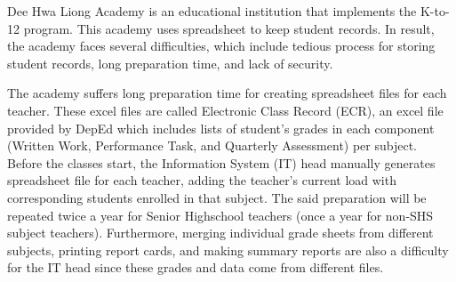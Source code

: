 \documentclass[11pt,a4paper,titlepage]{article}
\begin{document}




Dee Hwa Liong Academy is an educational institution that implements the K-to-12 program. This academy uses spreadsheet to keep student records. In result, the academy faces several difficulties, which include tedious process for storing student records, long preparation time, and lack of security.

The academy suffers long preparation time for creating spreadsheet files for each teacher. These excel files are called Electronic Class Record (ECR), an excel file provided by DepEd which includes lists of student's grades in each component (Written Work, Performance Task, and Quarterly Assessment) per subject. Before the classes start, the Information System (IT) head manually generates spreadsheet file for each teacher, adding the teacher's current load with corresponding students enrolled in that subject. The said preparation will be repeated twice a year for Senior Highschool teachers (once a year for non-SHS subject teachers). Furthermore, merging individual grade sheets from different subjects, printing report cards, and making summary reports are also a difficulty for the IT head since these grades and data come from different files.
\end{document}

